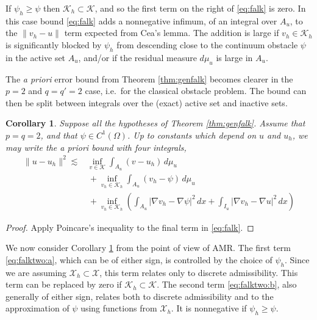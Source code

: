 \documentclass[]{interact}
\theoremstyle{plain}%
\newtheorem{corollary}[theorem]{Corollary}
\theoremstyle{definition}
\theoremstyle{remark}
\newcommand{\grad}{\nabla}
\newcommand{\cK}{\mathcal{K}}
\newcommand{\cX}{\mathcal{X}}
\begin{document}
If $\psi_h\ge \psi$ then $\cK_h\subset \cK$, and so the first term on the right of \eqref{eq:falk} is zero.  In this case bound \eqref{eq:falk} adds a nonnegative infimum, of an integral over $A_u$, to the $\|v_h-u\|$ term expected from Cea's lemma.  The addition is large if $v_h\in\cK_h$ is significantly blocked by $\psi_h$ from descending close to the continuum obstacle $\psi$ in the active set $A_u$, and/or if the residual measure $d\mu_u$ is large in $A_u$.

The \emph{a priori} error bound from Theorem \ref{thm:genfalk} becomes clearer in the $p=2$ and $q=q'=2$ case, i.e.~for the classical obstacle problem.  The bound can then be split between integrals over the (exact) active set and inactive sets.

\begin{corollary} \label{cor:falktwo}
Suppose all the hypotheses of Theorem \ref{thm:genfalk}.  Assume that $p=q=2$, and that $\psi \in C^1(\Omega)$.  Up to constants which depend on $u$ and $u_h$, we may write the \emph{a priori} bound with four integrals,
\begin{subequations}
\label{eq:falktwo}
\begin{align}
\|u-u_h\|^2 \lesssim &\inf_{v\in\cK} \int_{A_u} (v-u_h)\,d\mu_u \label{eq:falktwo:a} \\
&\, + \inf_{v_h\in\cK_h} \int_{A_u} (v_h-\psi)\,d\mu_u \label{eq:falktwo:b} \\
&\, + \inf_{v_h\in\cK_h} \left(\int_{A_u} |\grad v_h - \grad \psi|^2\,dx + \int_{I_u} |\grad v_h - \grad u|^2\,dx\right) \label{eq:falktwo:c}
\end{align}
\end{subequations}
\end{corollary}

\begin{proof}
Apply Poincare's inequality to the final term in \eqref{eq:falk}.
\end{proof}

We now consider Corollary \ref{cor:falktwo} from the point of view of AMR.  The first term \eqref{eq:falktwo:a}, which can be of either sign, is controlled by the choice of $\psi_h$.  Since we are assuming $\cX_h\subset \cX$, this term relates only to discrete admissibility.  This term can be replaced by zero if $\cK_h \subset \cK$.  The second term \eqref{eq:falktwo:b}, also generally of either sign, relates both to discrete admissibility and to the approximation of $\psi$ using functions from $\cX_h$.  It is nonnegative if $\psi_h\ge \psi$.
\end{document}
